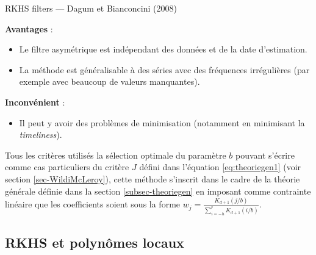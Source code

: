 \documentclass[
  11pt,
  french,
  a4paper]{article}
\providecommand{\tightlist}{%
  \setlength{\itemsep}{0pt}\setlength{\parskip}{0pt}}
\newcommand\1{\mathds{1}}
\begin{document}
\begin{summary_box}{RKHS filters --- Dagum et Bianconcini (2008)}

\textbf{Avantages} :

\begin{itemize}
\item
  Le filtre asymétrique est indépendant des données et de la date d'estimation.
\item
  La méthode est généralisable à des séries avec des fréquences irrégulières (par exemple avec beaucoup de valeurs manquantes).
\end{itemize}

\textbf{Inconvénient} :

\begin{itemize}
\tightlist
\item
  Il peut y avoir des problèmes de minimisation (notamment en minimisant la \emph{timeliness}).
\end{itemize}

\end{summary_box}

Tous les critères utilisés la sélection optimale du paramètre \(b\) pouvant s'écrire comme cas particuliers du critère \(J\) défini dans l'équation \eqref{eq:theoriegen1} (voir section \ref{sec-WildiMcLeroy}), cette méthode s'inscrit dans le cadre de la théorie générale définie dans la section \ref{subsec-theoriegen} en imposant comme contrainte linéaire que les coefficients soient sous la forme \(w_j=\frac{K_{d+1}(j/b)}{\sum_{i=-h}^{^p}K_{d+1}(i/b)}\).

\hypertarget{rkhs-et-polynuxf4mes-locaux}{%
\subsection{RKHS et polynômes locaux}\label{rkhs-et-polynuxf4mes-locaux}}
\end{document}
